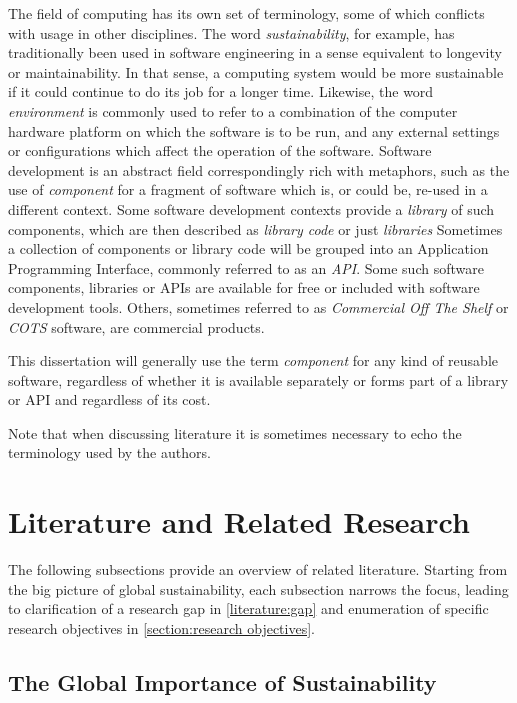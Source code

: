 The field of computing has its own set of terminology, some of which conflicts with usage in other disciplines. The word \emph{sustainability}, for example, has traditionally been used in software engineering in a sense equivalent to longevity or maintainability. In that sense, a computing system would be more sustainable if it could continue to do its job for a longer time. Likewise, the word \emph{environment} is commonly used to refer to a combination of the computer hardware platform on which the software is to be run, and any external settings or configurations which affect the operation of the software. Software development is an abstract field correspondingly rich with metaphors, such as the use of \emph{component} for a fragment of software which is, or could be, re-used in a different context. Some software development contexts provide a \emph{library} of such components, which are then described as \emph{library code} or just \emph{libraries} Sometimes a collection of components or library code will be grouped into an Application Programming Interface, commonly referred to as an \emph{API}. Some such software components, libraries or APIs are available for free or included with software development tools. Others, sometimes referred to as \emph{Commercial Off The Shelf} or \emph{COTS} software, are commercial products.

This dissertation will generally use the term \emph{component} for any kind of reusable software, regardless of whether it is available separately or forms part of a library or API and regardless of its cost.

Note that when discussing literature it is sometimes necessary to echo the terminology used by the authors.

\section{Literature and Related Research}
\label{section:literature}

The following subsections provide an overview of related literature. Starting from the big picture of global sustainability, each subsection narrows the focus, leading to clarification of a research gap in \autoref{literature:gap} and enumeration of specific research objectives in \autoref{section:research objectives}.

\subsection{The Global Importance of Sustainability}
\label{literature:importance}


